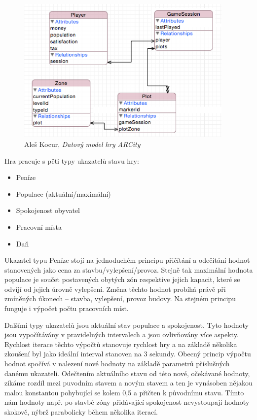 \documentclass[twoside,12pt]{article}
\begin{document}
 \begin{figure}[H]
\centering
    \includegraphics[width=400px, center]{images/core-data-model.png}
\captionsetup{justification=centering}
    \caption{Aleš Kocur, \textit{Datový model hry ARCity}}
    \label{class_diagram}
\end{figure}

 
 Hra pracuje s pěti typy ukazatelů stavu hry:
  
 \begin{itemize}
\item Peníze
\item Populace (aktuální/maximální)
\item Spokojenost obyvatel
\item Pracovní místa
\item Daň
\end{itemize}
 
 Ukazatel typu Peníze stojí na jednoduchém principu přičítání a odečítání hodnot stanovených jako cena za stavbu/vylepšení/provoz. Stejně tak maximální hodnota populace je součet postavených obytých zón respektive jejich kapacit, které se odvíjí od jejich úrovně vylepšení. Změna těchto hodnot probíhá právě při zmíněných úkonech -- stavba, vylepšení, provoz budovy. Na stejném principu funguje i výpočet počtu pracovních míst.
 
 Dalšími typy ukazatelů jsou aktuální stav populace a spokojenost. Tyto hodnoty jsou vypočítávány v pravidelných intervalech a jsou ovlivňovány více aspekty. Rychlost iterace těchto výpočtů stanovuje rychlost hry a na základě několika zkoušení byl jako ideální interval stanoven na 3 sekundy. Obecný princip výpočtu hodnot spočívá v nalezení nové hodnoty na základě parametrů příslušných danému ukazateli. Odečtením aktuálního stavu od této nové, očekávané hodnoty, zíkáme rozdíl mezi puvodním stavem a novým stavem a ten je vynásoben nějakou malou konstantou pohybující se kolem 0,5 a přičten k původnímu stavu. Tímto nám hodnoty např. po stavbě zóny přidávající spokojenost nevystoupají hodnoty skokově, nýbrž parabolicky během několika iterací.
 
\end{document}

